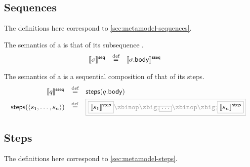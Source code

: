 \subsection{Sequences}\label{ssec:semantics-tockcsp-sequences}

The definitions here correspond to \cref{sec:metamodel-sequences}.

\begin{definition}[\msequence]

The semantics of a \msequence{} is that of its subsequence
.
%
\begin{align*}
	\llbracket \sigma \rrbracket^{\mathsf{seq}}
\quad\mathbin{\overset{\text{def}}=}\quad&	
	\llbracket \sigma.\mathsf{body} \rrbracket^{\mathsf{sseq}}
\end{align*}

\end{definition}

\begin{definition}[\msubsequence]

The semantics of a \msubsequence{} is a sequential composition of that of its steps.
%
\begin{align*}
	\sseqsema{\asseq}
	\quad\defeq\quad&	
	\funcname{steps}(\field{\asseq}{body})
\\
	\funcname{steps}(\langle \astep_1, \dotsc, \astep_n \rangle)
	\quad\defeq\quad&	
	\tlang{
	\olang{\stepsema{\astep_1}}
	\circseq
	\olang{\dotso}
	\circseq
	\olang{\stepsema{\astep_n}}
	}
\end{align*}

\end{definition}

\subsection{Steps}\label{ssec:semantics-tockcsp-steps}

The definitions here correspond to \cref{sec:metamodel-steps}.

\newcommand{\deadline}{\mathbin{\scriptstyle\blacktriangleright}}

